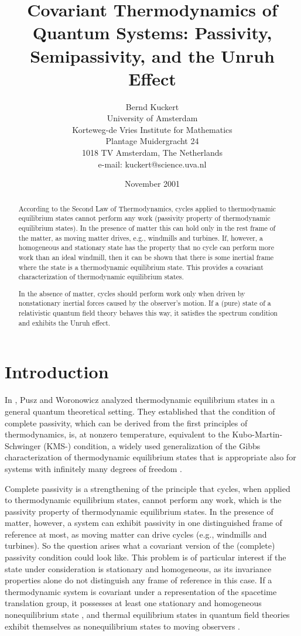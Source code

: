 \documentclass[a4paper,11pt]{article}
\title{Covariant Thermodynamics of Quantum Systems:
Passivity, Semipassivity, and the Unruh Effect}
\author{Bernd Kuckert\\University of Amsterdam\\
Korteweg-de Vries Institute for Mathematics\\Plantage Muidergracht 24\\
1018 TV Amsterdam, The Netherlands\\e-mail: kuckert@science.uva.nl}
\date{November 2001}
\begin{document}
\maketitle

\begin{abstract}
According to the Second Law of Thermodynamics, cycles applied to
thermodynamic equilibrium states cannot perform any work (passivity
property of thermodynamic equilibrium states). In the presence of matter
this can hold only in the rest frame of the matter,
as moving matter drives, e.g., windmills and turbines.
If, however, a homogeneous and stationary state has the property that no cycle
can perform more work than an ideal windmill, then it can be shown
that there is some inertial frame where the state is a
thermodynamic equilibrium state.
This provides a covariant characterization of thermodynamic equilibrium
states.

In the absence of matter, cycles should perform work only when driven by
nonstationary inertial forces caused by the observer's motion.
If a (pure) state of a relativistic quantum field theory behaves
this way, it satisfies the spectrum condition and exhibits
the Unruh effect.

\end{abstract}

\section{Introduction}

In \cite{PW78}, Pusz and Woronowicz analyzed thermodynamic equilibrium
states in a general quantum theoretical setting. They established
that the condition of complete passivity, which can be derived from
the first principles of thermodynamics, is, at nonzero temperature,
equivalent to the
Kubo-Martin-Schwinger (KMS-) condition, a widely used
generalization of the Gibbs characterization of thermodynamic
equilibrium states that is appropriate also for systems with
infinitely many degrees of freedom \cite{Kubo, MarS,HHW,Haa92}.

Complete passivity is a strengthening of the principle that
cycles, when applied to thermodynamic equilibrium
states, cannot perform any work, which is the passivity property of
thermodynamic equilibrium states. In the
presence of matter, however, a system can exhibit passivity
in one distinguished
frame of reference at most, as moving matter can drive cycles
(e.g., windmills and turbines). So the question arises
what a covariant version of the (complete) passivity condition
could look like.
This problem is of particular interest if the state under consideration
is stationary and homogeneous, as its invariance properties alone do not
distinguish any frame of reference in this case.
If a thermodynamic system is
covariant under a representation of the spacetime translation group, it
possesses at least one stationary and homogeneous nonequilibrium state
\cite{Nar77}, and thermal equilibrium states in quantum field
theories exhibit themselves as nonequilibrium states to
moving observers \cite{Nar77,Oji86}.
\end{document}
